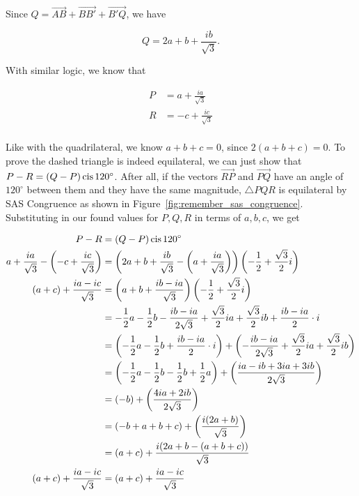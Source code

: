 \documentclass[../key.tex]{subfiles}
\begin{document}
Since $Q=\overrightarrow{AB} + \overrightarrow{BB'} + \overrightarrow{B'Q}$, we have

$$Q = 2a + b + \frac{ib}{\sqrt{3}}.$$

With similar logic, we know that

\begin{align*}
P &= a + \frac{ia}{\sqrt{3}} \\
R &= -c + \frac{ic}{\sqrt{3}} \\
\end{align*}

Like with the quadrilateral, we know $a+b+c=0$, since $2(a+b+c)=0$. To prove the dashed triangle is indeed equilateral, we can just show that $P-R=(Q-P)\operatorname{cis} 120^\circ$. After all, if the vectors $\overrightarrow{RP}$ and $\overrightarrow{PQ}$ have an angle of $120^\circ$ between them and they have the same magnitude, $\triangle PQR$ is equilateral by SAS Congruence as shown in Figure~\ref{fig:remember_sas_congruence}. Substituting in our found values for $P,Q,R$ in terms of $a,b,c$, we get

\begin{align*}
P - R &= (Q - P) \operatorname{cis} 120^\circ \\
a + \frac{ia}{\sqrt{3}} - \left(-c + \frac{ic}{\sqrt{3}}\right) &= \left(2a + b + \frac{ib}{\sqrt{3}} - \left(a + \frac{ia}{\sqrt{3}}\right)\right) \left(-\frac{1}{2} + \frac{\sqrt{3}}{2}i\right) \\
(a+c) + \frac{ia-ic}{\sqrt{3}} &= \left(a+b+\frac{ib-ia}{\sqrt{3}}\right)\left(-\frac{1}{2} + \frac{\sqrt{3}}{2}i\right) \\
 &= -\frac{1}{2} a - \frac{1}{2} b - \frac{ib-ia}{2\sqrt{3}} + \frac{\sqrt{3}}{2}ia + \frac{\sqrt{3}}{2}ib + \frac{ib-ia}{2}\cdot i \\
 &= \left( -\frac{1}{2} a - \frac{1}{2} b + \frac{ib-ia}{2} \cdot i \right) + \left(-\frac{ib-ia}{2\sqrt{3}} + \frac{\sqrt{3}}{2}ia + \frac{\sqrt{3}}{2}ib\right) \\
 &= \left( -\frac{1}{2} a - \frac{1}{2} b - \frac{1}{2} b + \frac{1}{2} a\right) + \left(\frac{ia-ib+3ia+3ib}{2\sqrt{3}}\right) \\
 &= \left( -b \right) + \left(\frac{4ia+2ib}{2\sqrt{3}}\right) \\
 &= \left( -b + a + b + c\right) + \left(\frac{i(2a + b)}{\sqrt{3}}\right) \\
 &= (a + c) + \frac{i(2a + b - (a+b+c))}{\sqrt{3}} \\
(a+c) + \frac{ia-ic}{\sqrt{3}} &= (a+c) + \frac{ia-ic}{\sqrt{3}} \\
\end{align*}
\end{document}
